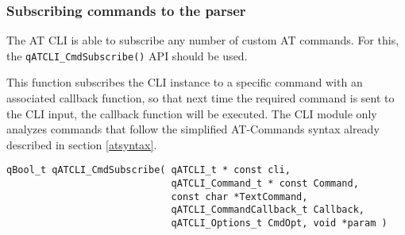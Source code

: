 \subsubsection{Subscribing commands to the parser}
The AT CLI is able to subscribe any number of custom AT commands. For this, the 
\lstinline{qATCLI_CmdSubscribe()}  API should be used.

This function subscribes the CLI instance to a specific command with an associated callback function, so that next time the required command is sent to the CLI input, the callback function will be executed.
\medskip
The CLI module only analyzes commands that follow the simplified AT-Commands syntax already described in section \ref{atsyntax}.
\medskip

\begin{lstlisting}[style=CStyle]
qBool_t qATCLI_CmdSubscribe( qATCLI_t * const cli, 
                             qATCLI_Command_t * const Command, 
                             const char *TextCommand, 
                             qATCLI_CommandCallback_t Callback, 
                             qATCLI_Options_t CmdOpt, void *param )
\end{lstlisting}

